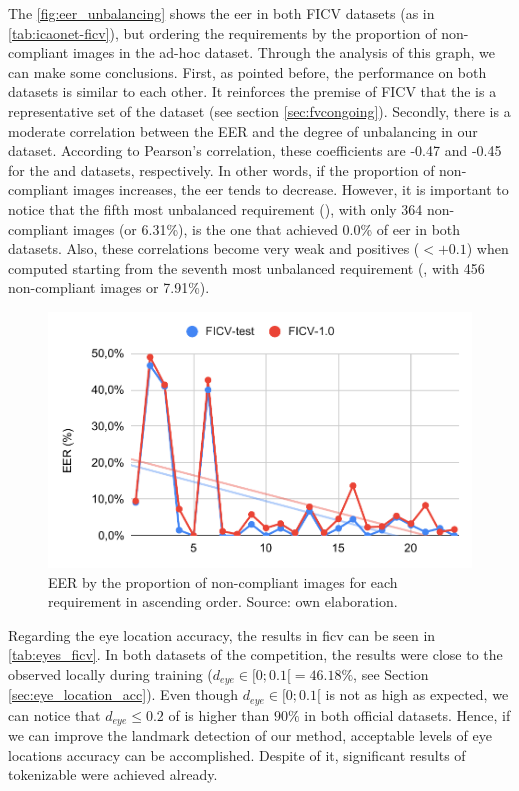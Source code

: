 The \autoref{fig:eer_unbalancing} shows the \acs{eer} in both FICV datasets (as in \autoref{tab:icaonet-ficv}), but ordering the requirements by the proportion of non-compliant images in the ad-hoc dataset. Through the analysis of this graph, we can make some conclusions. First, as pointed before, the performance on both datasets is similar to each other. It reinforces the premise of FICV that the \ficvtest is a representative set of the \ficvofficial dataset (see section \ref{sec:fvcongoing}). Secondly, there is a moderate correlation between the EER and the degree of unbalancing in our dataset. According to Pearson's correlation, these coefficients are -0.47 and -0.45 for the \ficvtest and \ficvofficial datasets, respectively. In other words, if the proportion of non-compliant images increases, the \acs{eer} tends to decrease. However, it is important to notice that the fifth most unbalanced requirement (\veiloverface), with only 364 non-compliant images (or 6.31\%), is the one that achieved 0.0\% of \acs{eer} in both datasets. Also, these correlations become very weak and positives ($< +0.1$) when computed starting from the seventh most unbalanced requirement (\toodarklight, with 456 non-compliant images or 7.91\%).

\begin{figure}[tb]
\centering
\includegraphics[width=0.8\linewidth]{images/graphs/eer_unbalancing.pdf}
\caption{EER by the proportion of non-compliant images for each requirement in ascending order. Source: own elaboration.}
\label{fig:eer_unbalancing}
\end{figure}

Regarding the eye location accuracy, the results in \acs{ficv} can be seen in \autoref{tab:eyes_ficv}. In both datasets of the competition, the results were close to the observed locally during training ($d_{eye} \in [0;0.1[ = 46.18\%$, see Section \ref{sec:eye_location_acc}). Even though $d_{eye} \in [0;0.1[$ is not as high as expected, we can notice that $d_{eye} \leq 0.2$ of \methodname is higher than $90\%$ in both official datasets. Hence, if we can improve the landmark detection of our method, acceptable levels of eye locations accuracy can be accomplished. Despite of it, significant results of tokenizable were achieved already.


